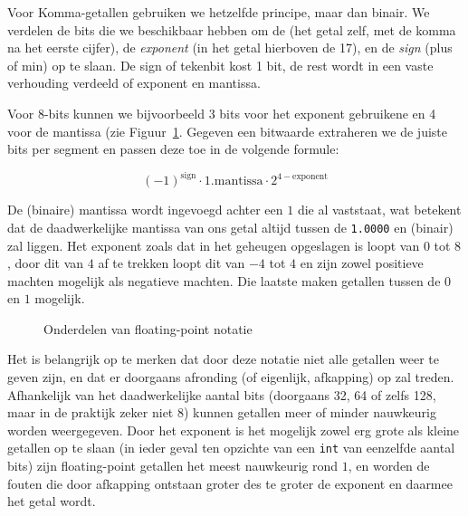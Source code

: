 Voor Komma-getallen gebruiken we hetzelfde principe, maar dan binair. We verdelen de bits die we beschikbaar hebben om de  (het getal zelf, met de komma na het eerste cijfer), de \emph{exponent} (in het getal hierboven de 17), en de \emph{sign} (plus of min) op te slaan. De sign of tekenbit kost 1 bit, de rest wordt in een vaste verhouding verdeeld of exponent en mantissa.

Voor 8-bits kunnen we bijvoorbeeld 3 bits voor het exponent gebruikene en 4 voor de mantissa (zie Figuur~\ref{fig:float8}. Gegeven een bitwaarde extraheren we de juiste bits per segment en passen deze toe in de volgende formule:

$$(-1)^{\text{sign}} \cdot 1.\text{mantissa} \cdot 2^{4-\text{exponent}}$$

De (binaire) mantissa wordt ingevoegd achter een $1$ die al vaststaat, wat betekent dat de daadwerkelijke mantissa van ons getal altijd tussen de \texttt{1.0000} en  (binair) zal liggen. Het exponent zoals dat in het geheugen opgeslagen is loopt van $0$ tot $8$, door dit van $4$ af te trekken loopt dit van $-4$ tot $4$ en zijn zowel positieve machten mogelijk als negatieve machten. Die laatste maken getallen tussen de $0$ en $1$ mogelijk.

\begin{figure}[ht]
\centering
{}
\caption{Onderdelen van floating-point notatie}
\label{fig:float8}
\end{figure}

Het is belangrijk op te merken dat door deze notatie niet alle getallen weer te geven zijn, en dat er doorgaans afronding (of eigenlijk, afkapping) op zal treden. Afhankelijk van het daadwerkelijke aantal bits (doorgaans 32, 64 of zelfs 128, maar in de praktijk zeker niet 8) kunnen getallen meer of minder nauwkeurig worden weergegeven. Door het exponent is het mogelijk zowel erg grote als kleine getallen op te slaan (in ieder geval ten opzichte van een \texttt{int} van eenzelfde aantal bits) zijn floating-point getallen het meest nauwkeurig rond $1$, en worden de fouten die door afkapping ontstaan groter des te groter de exponent en daarmee het getal wordt.


